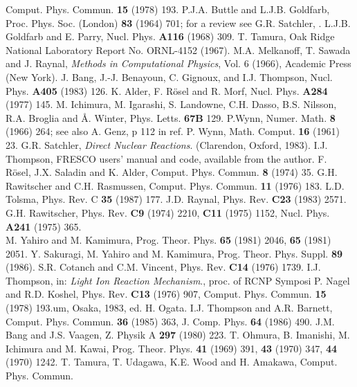 \documentclass[11pt,a4paper]{article}
\begin{document}
\begin{thebibliography}{99}
Comput. Phys. Commun. {\bf 15} (1978) 193.
P.J.A. Buttle and L.J.B. Goldfarb,
Proc. Phys. Soc. (London) {\bf 83} (1964) 701;
for a review see G.R. Satchler,  \cite[\S 6.14.1]{SATCH83}.
L.J.B. Goldfarb and E. Parry, Nucl. Phys. {\bf A116} (1968) 309.
T. Tamura, Oak Ridge National Laboratory Report No. ORNL-4152 (1967).
M.A. Melkanoff, T. Sawada and J. Raynal,
{\em Methods in Computational Physics}, Vol. 6 (1966),
Academic Press (New York).
J. Bang, J.-J. Benayoun, C. Gignoux, and I.J. Thompson,
Nucl. Phys. {\bf A405} (1983) 126.
K. Alder, F. R\"osel and R. Morf, Nucl. Phys. {\bf A284} (1977) 145.
M. Ichimura, M. Igarashi, S. Landowne, C.H. Dasso, B.S. Nilsson, R.A. Broglia
and \AA. Winter, Phys. Letts. {\bf 67B} 129.
P.Wynn, Numer. Math. {\bf 8} (1966) 264;
see also A. Genz, p 112 in ref.\cite{Pade}
P. Wynn, Math. Comput. {\bf 16} (1961) 23.
G.R. Satchler, {\em Direct Nuclear Reactions}. (Clarendon, Oxford, 1983).
I.J. Thompson, FRESCO users' manual and code, available from
the author.
F. R\"osel, J.X. Saladin and K. Alder, Comput. Phys. Commun. {\bf 8}
(1974) 35.
G.H. Rawitscher and C.H. Rasmussen, Comput. Phys. Commun. {\bf 11}
(1976) 183.
L.D. Tolsma, Phys. Rev. C {\bf 35} (1987) 177.
J.D. Raynal, Phys. Rev. {\bf C23} (1983) 2571.
G.H. Rawitscher, Phys. Rev. {\bf C9} (1974) 2210,
{\bf C11} (1975) 1152, Nucl. Phys. {\bf A241} (1975) 365.
\\
M. Yahiro and M. Kamimura, Prog. Theor. Phys. {\bf 65} (1981) 2046,
{\bf 65} (1981) 2051.
Y. Sakuragi, M. Yahiro and M. Kamimura, Prog. Theor. Phys. Suppl.
{\bf 89} (1986).
S.R. Cotanch and C.M. Vincent, Phys. Rev. {\bf C14} (1976) 1739.
I.J. Thompson, in: {\em Light Ion Reaction Mechanism}., proc. of RCNP
Symposi
P. Nagel and R.D. Koshel, Phys. Rev. {\bf C13} (1976) 907,
Comput. Phys. Commun. {\bf 15} (1978) 193.um, Osaka, 1983, ed. H. Ogata.
I.J. Thompson and A.R. Barnett, Comput. Phys. Commun. {\bf 36}
(1985) 363, J. Comp. Phys. {\bf 64} (1986) 490.
J.M. Bang and  J.S. Vaagen, Z. Physik A {\bf 297} (1980) 223.
T. Ohmura, B. Imanishi, M. Ichimura and M. Kawai, Prog. Theor. Phys.
{\bf 41} (1969) 391, {\bf 43} (1970) 347,
{\bf 44} (1970) 1242.
T. Tamura, T. Udagawa, K.E. Wood and H. Amakawa, Comput. Phys. Commun.

\end{thebibliography}
\end{document}
